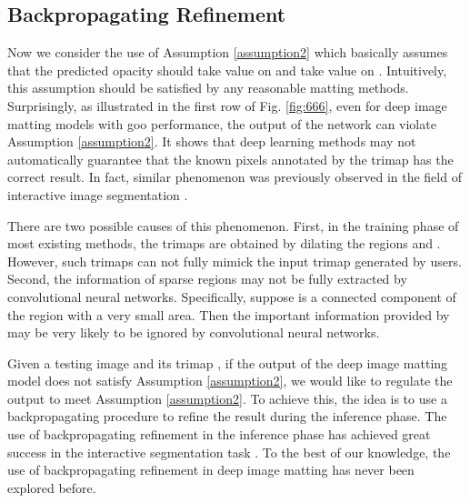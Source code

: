 \documentclass{article}
\theoremstyle{plain}
\begin{document}
\subsection{Backpropagating Refinement}




Now we consider the use of Assumption \ref{assumption2}
which
basically assumes that
the predicted opacity  should take value 
on  and take value  on . 
Intuitively, this assumption should be satisfied 
by any reasonable matting methods.
Surprisingly,
as illustrated in the first row of Fig. \ref{fig:666}, 
even for deep image matting models with goo performance,
the output of the network can violate Assumption \ref{assumption2}.
It shows that deep learning methods may not
automatically
guarantee that the known pixels annotated by the trimap has the correct result.
In fact,
similar phenomenon was previously observed in the field of interactive image segmentation \cite{Jang2019Interactive,Sofiiuk2020Rethinking}.


There are two possible causes of this phenomenon.
First, in the training phase of most existing methods, the trimaps are obtained by dilating the regions  and .
However, such trimaps can not fully mimick the input trimap generated by users.
Second, 
the information of sparse regions may not be fully extracted by convolutional neural networks.
Specifically, suppose  is a connected component of the region  with a very small area.
Then the important information provided by  may be very likely to be ignored by convolutional neural networks.




Given a testing image  and its trimap ,
if the output of the deep image matting model does not satisfy Assumption \ref{assumption2},
we would like to regulate the output to meet Assumption \ref{assumption2}.
To achieve this,
the idea is to use a backpropagating procedure to refine the result during the inference phase.
The use of backpropagating refinement in the inference phase
has achieved great success in the interactive segmentation task \cite{Jang2019Interactive,Sofiiuk2020Rethinking}.
To the best of our knowledge, 
the use of backpropagating refinement in deep image matting has never been explored before.
\end{document}
